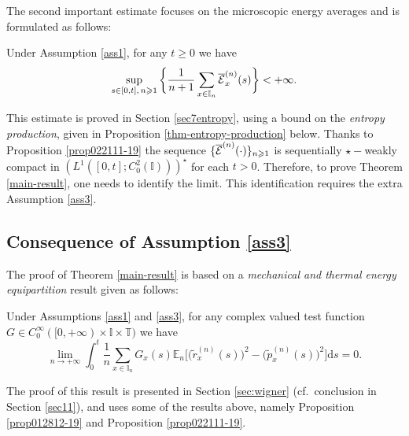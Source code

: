 \documentclass[EJP]{ejpecp} %
\newcommand\T{{\mathbb I}}
\newcommand{\bbT}{\mathbb T}
\renewcommand{\ge}{\geqslant}
\newcommand{\dd  }{\mathrm{d}}
\renewcommand{\tilde}{\widetilde}
\renewcommand{\bar}{\overline}
\numberwithin{equation}{section}
\begin{document}
The second important estimate focuses on the microscopic energy averages and is formulated as follows:
\begin{proposition} Under Assumption \ref{ass1}, 
\label{prop022111-19}
for any $t\ge0$ we have
\begin{equation}
\label{022111-19}
\sup_{s\in[0,t],\,n\ge1}\bigg\{\frac{1}{n+1}\sum_{x\in\T_n}\bar{\cal
    E}_x^{(n)}(s)\bigg\}<+\infty.
\end{equation}
\end{proposition}


This estimate is proved in Section \ref{sec7entropy}, using a bound on the \emph{entropy production}, given in Proposition \ref{thm-entropy-production} below. 
Thanks to Proposition   \ref{prop022111-19}   the sequence $\{ \bar{\cal  E}^{(n)}(\cdot)\}_{n\ge1}$ 
is sequentially $\star-$weakly
compact in $(L^1([0,t];C_{0}^2(\T)))^\star$ for each $t>0$.  Therefore, to prove Theorem \ref{main-result}, one needs to identify the limit.  This identification requires the extra Assumption \ref{ass3}. 

\subsection{Consequence of Assumption \ref{ass3}}
The proof of Theorem \ref{main-result} is based on a 
\emph{mechanical and thermal energy equipartition} result given as follows:
\begin{proposition}
\label{equipartition}
Under Assumptions \ref{ass1} and \ref{ass3},  for any complex valued test function $
G\in C_0^\infty([0,+\infty)\times \T\times\bbT)$ we have
 \begin{equation}
\label{042701-20}
\lim_{n\to+\infty}\int_0^{t} \frac 1{n}  \sum_{x\in\T_n}
                                                 G_x(s)
   {\mathbb E}_n\Big[\big(\tilde r_x^{(n)}(s) \big)^2-\big(\tilde p_x^{(n)}(s) \big)^2\Big]
                                                 \dd s=0.
\end{equation}
\end{proposition}
The proof of this result is presented in Section \ref{sec:wigner} (cf.~conclusion in Section \ref{sec11}), and uses some of the results above, namely Proposition \ref{prop012812-19} and Proposition \ref{prop022111-19}. 




\end{document}
